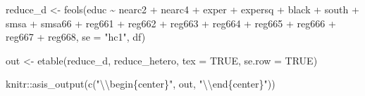\documentclass[
]{article}
\newenvironment{Shaded}{\begin{snugshade}}{\end{snugshade}}
\newcommand{\AttributeTok}[1]{\textcolor[rgb]{0.77,0.63,0.00}{#1}}
\newcommand{\ConstantTok}[1]{\textcolor[rgb]{0.00,0.00,0.00}{#1}}
\newcommand{\FunctionTok}[1]{\textcolor[rgb]{0.00,0.00,0.00}{#1}}
\newcommand{\NormalTok}[1]{#1}
\newcommand{\OtherTok}[1]{\textcolor[rgb]{0.56,0.35,0.01}{#1}}
\newcommand{\SpecialCharTok}[1]{\textcolor[rgb]{0.00,0.00,0.00}{#1}}
\newcommand{\StringTok}[1]{\textcolor[rgb]{0.31,0.60,0.02}{#1}}
\begin{document}
\begin{Shaded}
\begin{Highlighting}[]
\NormalTok{reduce\_d }\OtherTok{\textless{}{-}} \FunctionTok{feols}\NormalTok{(educ }\SpecialCharTok{\textasciitilde{}}\NormalTok{ nearc2 }\SpecialCharTok{+}\NormalTok{ nearc4 }\SpecialCharTok{+}\NormalTok{ exper }\SpecialCharTok{+}\NormalTok{ expersq }\SpecialCharTok{+}\NormalTok{ black }\SpecialCharTok{+}\NormalTok{ south }\SpecialCharTok{+}\NormalTok{ smsa }\SpecialCharTok{+}\NormalTok{ smsa66 }\SpecialCharTok{+}
\NormalTok{                         reg661 }\SpecialCharTok{+}\NormalTok{ reg662 }\SpecialCharTok{+}\NormalTok{ reg663 }\SpecialCharTok{+}\NormalTok{ reg664 }\SpecialCharTok{+}\NormalTok{ reg665 }\SpecialCharTok{+}\NormalTok{ reg666 }\SpecialCharTok{+}\NormalTok{ reg667 }\SpecialCharTok{+}\NormalTok{ reg668,}
                         \AttributeTok{se =} \StringTok{"hc1"}\NormalTok{, df)}

\NormalTok{out }\OtherTok{\textless{}{-}} \FunctionTok{etable}\NormalTok{(reduce\_d, reduce\_hetero, }\AttributeTok{tex =} \ConstantTok{TRUE}\NormalTok{, }\AttributeTok{se.row =} \ConstantTok{TRUE}\NormalTok{) }
\end{Highlighting}
\end{Shaded}

\begin{Shaded}
\begin{Highlighting}[]
\NormalTok{knitr}\SpecialCharTok{::}\FunctionTok{asis\_output}\NormalTok{(}\FunctionTok{c}\NormalTok{(}\StringTok{"}\SpecialCharTok{\textbackslash{}\textbackslash{}}\StringTok{begin\{center\}"}\NormalTok{, out, }\StringTok{"}\SpecialCharTok{\textbackslash{}\textbackslash{}}\StringTok{end\{center\}"}\NormalTok{)) }
\end{Highlighting}
\end{Shaded}
\end{document}
